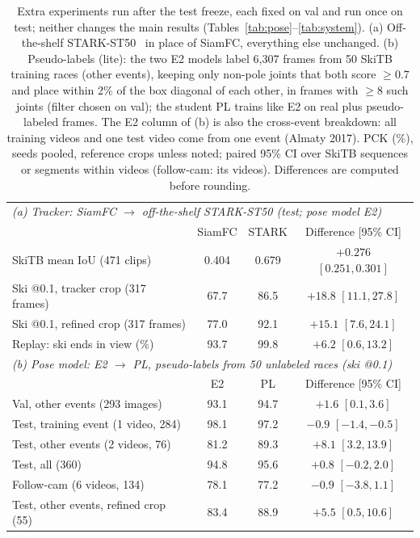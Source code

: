 \documentclass{article}
\begin{document}
\begin{table}[h]
  \centering
  \small
  \setlength{\tabcolsep}{4pt}
  \begin{tabular}{lccc}
    \toprule
    \multicolumn{4}{l}{\emph{(a) Tracker: SiamFC $\to$ off-the-shelf STARK-ST50 (test; pose model E2)}} \\
    & SiamFC & STARK & Difference [95\% CI] \\
    \midrule
    SkiTB mean IoU (471 clips) & 0.404 & 0.679 & $+0.276$ $[0.251, 0.301]$ \\
    Ski @0.1, tracker crop (317 frames) & 67.7 & 86.5 & $+18.8$ $[11.1, 27.8]$ \\
    Ski @0.1, refined crop (317 frames) & 77.0 & 92.1 & $+15.1$ $[7.6, 24.1]$ \\
    Replay: ski ends in view (\%) & 93.7 & 99.8 & $+6.2$ $[0.6, 13.2]$ \\
    \midrule
    \multicolumn{4}{l}{\emph{(b) Pose model: E2 $\to$ PL, pseudo-labels from 50 unlabeled races (ski @0.1)}} \\
    & E2 & PL & Difference [95\% CI] \\
    \midrule
    Val, other events (293 images) & 93.1 & 94.7 & $+1.6$ $[0.1, 3.6]$ \\
    Test, training event (1 video, 284) & 98.1 & 97.2 & $-0.9$ $[-1.4, -0.5]$ \\
    Test, other events (2 videos, 76) & 81.2 & 89.3 & $+8.1$ $[3.2, 13.9]$ \\
    Test, all (360) & 94.8 & 95.6 & $+0.8$ $[-0.2, 2.0]$ \\
    Follow-cam (6 videos, 134) & 78.1 & 77.2 & $-0.9$ $[-3.8, 1.1]$ \\
    Test, other events, refined crop (55) & 83.4 & 88.9 & $+5.5$ $[0.5, 10.6]$ \\
    \bottomrule
  \end{tabular}
  \caption{Extra experiments run after the test freeze, each fixed on val and run once on test; neither changes the
  main results (Tables~\ref{tab:pose}--\ref{tab:system}). (a) Off-the-shelf
  STARK-ST50~\cite{yan2021learning,yan2021starkcode} in place of SiamFC, everything else unchanged. (b) Pseudo-labels
  (lite): the two E2 models label 6,307 frames from 50 SkiTB training races (other events), keeping only non-pole
  joints that both score $\ge0.7$ and place within 2\% of the box diagonal of each other, in frames with $\ge8$ such
  joints (filter chosen on val); the student PL trains like E2 on real plus pseudo-labeled frames. The E2 column of (b)
  is also the cross-event breakdown: all training videos and one test video come from one event (Almaty 2017).
  PCK (\%), seeds pooled, reference crops unless noted; paired 95\% CI over SkiTB sequences or segments within videos
  (follow-cam: its videos). Differences are computed before rounding.}
  \label{tab:extras}
\end{table}
\end{document}

